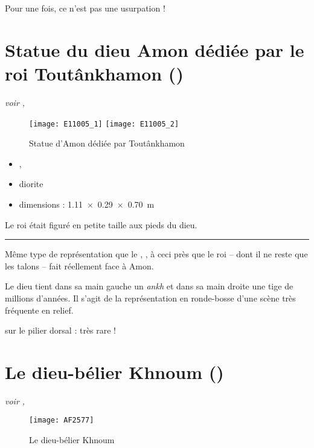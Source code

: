 \documentclass[dvipsnames,a4paper,twoside,10pt,openany,article]{memoir}
\newcommand{\separation}{%
  {\noi\hspace*{\fill}\rule{.33\textwidth}{1pt}\hspace*{\fill}}%
}
\begin{document}
Pour une fois, ce n'est pas une usurpation !


\chapter{Statue du dieu Amon dédiée par le roi Toutânkhamon 
         ()}
\label{sec:E11005}

\puceb{} \emph{voir , }
\bigskip

\begin{figure}[!h]
  \texttt{[image: E11005\_1]}%
  \qquad%
  \texttt{[image: E11005\_2]}%
  \caption{Statue d'Amon dédiée par Toutânkhamon 
           }
  \label{fig:E11005}
\end{figure}

\begin{itemize}
  \item {}, 
  \item diorite
  \item dimensions : \SI{1.11x0.29x0.70}{\m}
\end{itemize}

Le roi était figuré en petite taille aux pieds du dieu.

\separation

Même type de représentation que le , 
, à ceci près que le roi -- dont il ne reste que les 
talons -- fait réellement face à Amon.

Le dieu tient dans sa main gauche un \emph{ankh} et dans sa main 
droite une tige de millions d'années. Il s'agit de la représentation 
en ronde-bosse d'une scène très fréquente en relief. 

 sur le pilier dorsal : très rare !


\chapter{Le dieu-bélier Khnoum ()}
\label{sec:AF2577}

\puceb{} \emph{voir , }
\bigskip

\begin{figure}[!h]
  \texttt{[image: AF2577]}
  \caption{Le dieu-bélier Khnoum }
  \label{fig:AF2577}
\end{figure}
\end{document}
